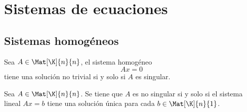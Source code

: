 \documentclass[compacto,10pt]{pubciencias-notas}
\begin{document}
\encabezado

\vspace*{-8mm}
\setcounter{section}{1}
\section{Sistemas de ecuaciones}
\setcounter{subsection}{3}
\subsection{Sistemas homogéneos}

\begin{teo}\label{Sem03Clas02CarcSisHom}
    Sea $A \in \Mat[\K]{n}{n}$, el sistema homogéneo 
    \[
        Ax = 0
    \]
    tiene una solución no trivial si y solo si $A$ es singular. 
\end{teo}

\begin{teo}\label{Sem03Clas02InvCat}
    Sea $A \in \Mat[\K]{n}{n}$. Se tiene que $A$ es no singular si y solo si el sistema lineal $Ax=b$ tiene una solución única para cada $b \in \Mat[\K]{n}{1}$.
\end{teo}
\end{document}
